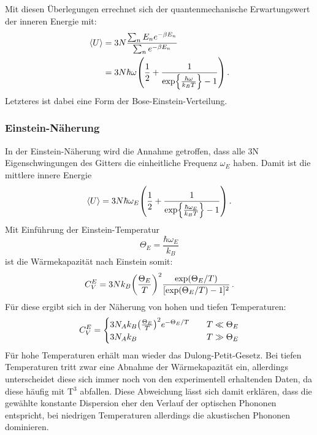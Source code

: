 Mit diesen Überlegungen errechnet sich der quantenmechanische Erwartungswert der inneren Energie mit:
\begin{align}
	\expval{U} &= 3N \frac{\sum_n E_n e^{-\beta E_n}}{\sum_n e^{-\beta E_n} }  \\
			& = 3N \hbar \omega \qty(\frac{1}{2} + \frac{1}{\exp{\frac{\hbar\omega}{k_B T}}-1}) \,.
\end{align}
Letzteres ist dabei eine Form der Bose-Einstein-Verteilung.

\subsubsection{Einstein-Näherung}

In der Einstein-Näherung wird die Annahme getroffen, dass alle 3N Eigenschwingungen des Gitters die einheitliche Frequenz $\omega_E$ haben. Damit ist die mittlere innere Energie
\begin{equation}
	\expval{U} =  3N \hbar \omega_E \qty(\frac{1}{2} + \frac{1}{\exp{\frac{\hbar\omega_E}{k_B T}}-1}) \,.
\end{equation}
Mit Einführung der Einstein-Temperatur
\begin{equation}
	\Theta_E = \frac{\hbar\omega_E}{k_B}
\end{equation}
ist die Wärmekapazität nach Einstein somit:
\begin{equation}
	C_V^E = 3N k_B \qty(\frac{\Theta_E}{T})^2 \frac{\exp(\Theta_E/T)}{[\exp(\Theta_E/T)-1]^2} \,.
	\label{eq:Cv_Einstein}
\end{equation}
%
Für diese ergibt sich in der Näherung von hohen und tiefen Temperaturen:
\begin{equation}
	C_V^E = \begin{cases}
		 3N_A k_B \qty(\frac{\Theta_E}{T})^2 e^{-\Theta_E/T} &\quad T \ll\Theta_E \\
		3N_A k_B &\quad T \gg \Theta_E 		
	\end{cases}
\end{equation}
Für hohe Temperaturen erhält man wieder das Dulong-Petit-Gesetz. Bei tiefen Temperaturen tritt zwar eine Abnahme der Wärmekapazität ein, allerdings unterscheidet diese sich immer noch von den experimentell erhaltenden Daten, da diese häufig mit T$^3$ abfallen.
Diese Abweichung lässt sich damit erklären, dass die gewählte konstante Dispersion eher den Verlauf der optischen Phononen entspricht, bei niedrigen Temperaturen allerdings die akustischen Phononen dominieren.

